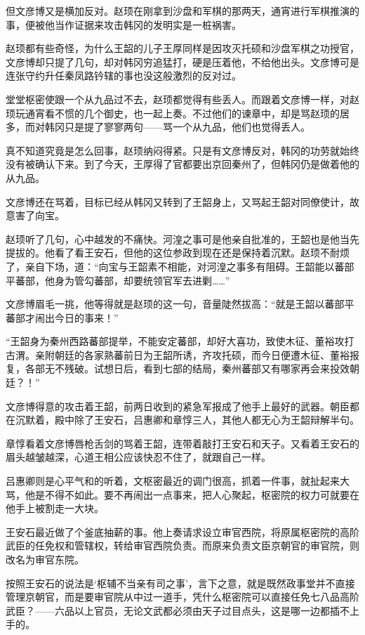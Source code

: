 但文彦博又是横加反对。赵顼在刚拿到沙盘和军棋的那两天，通宵进行军棋推演的事，便被他当作证据来攻击韩冈的发明实是一桩祸害。

赵顼都有些奇怪，为什么王韶的儿子王厚同样是因攻灭托硕和沙盘军棋之功授官，文彦博却只提了几句，却对韩冈穷追猛打，硬是压着他，不给他出头。文彦博可是连张守约升任秦凤路钤辖的事也没这般激烈的反对过。

堂堂枢密使跟一个从九品过不去，赵顼都觉得有些丢人。而跟着文彦博一样，对赵顼玩通宵看不惯的几个御史，也一起上奏。不过他们的谏章中，却是骂赵顼的居多，而对韩冈只是提了寥寥两句——骂一个从九品，他们也觉得丢人。

真不知道究竟是怎么回事，赵顼纳闷得紧。只是有文彦博反对，韩冈的功劳就始终没有被确认下来。到了今天，王厚得了官都要出京回秦州了，但韩冈仍是做着他的从九品。

文彦博还在骂着，目标已经从韩冈又转到了王韶身上，又骂起王韶对同僚使计，故意害了向宝。

赵顼听了几句，心中越发的不痛快。河湟之事可是他亲自批准的，王韶也是他当先提拔的。他看了看王安石，但他的这位参政到现在还是保持着沉默。赵顼不耐烦了，亲自下场，道：“向宝与王韶素不相能，对河湟之事多有阻碍。王韶能以蕃部平蕃部，他身为管勾蕃部，却要统领官军去进剿……”

文彦博眉毛一挑，他等得就是赵顼的这一句，音量陡然拔高：“就是王韶以蕃部平蕃部才闹出今日的事来！”

“王韶身为秦州西路蕃部提举，不能安定蕃部，却好大喜功，致使木征、董裕攻打古渭。亲附朝廷的各家熟蕃前日为王韶所诱，齐攻托硕，而今日便遭木征、董裕报复，各部无不残破。试想日后，看到七部的结局，秦州蕃部又有哪家再会来投效朝廷？！”

文彦博得意的攻击着王韶，前两日收到的紧急军报成了他手上最好的武器。朝臣都在沉默着，殿中除了王安石，吕惠卿和章惇三人，其他人都无心为王韶辩解半句。

章惇看着文彦博唇枪舌剑的骂着王韶，连带着敲打王安石和天子。又看着王安石的眉头越皱越深，心道王相公应该快忍不住了，就跟自己一样。

吕惠卿则是心平气和的听着，文枢密最近的调门很高，抓着一件事，就扯起来大骂，他是不得不如此。要不再闹出一点事来，把人心聚起，枢密院的权力可就要在他手上被割走一大块。

王安石最近做了个釜底抽薪的事。他上奏请求设立审官西院，将原属枢密院的高阶武臣的任免权和管辖权，转给审官西院负责。而原来负责文臣京朝官的审官院，则改名为审官东院。

按照王安石的说法是‘枢辅不当亲有司之事’，言下之意，就是既然政事堂并不直接管理京朝官，而是要审官院从中过一道手，凭什么枢密院可以直接任免七八品高阶武臣？——六品以上官员，无论文武都必须由天子过目点头，这是哪一边都插不上手的。

